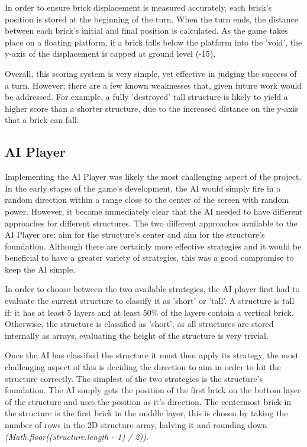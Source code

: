 \documentclass[runningheads]{llncs}
\begin{document}
	In order to ensure brick displacement is measured accurately, each brick's position is stored at the beginning of the turn. When the turn ends, the distance between each brick's initial and final position is calculated. As the game takes place on a floating platform, if a brick falls below the platform into the 'void', the y-axis of the displacement is capped at ground level (-15).
	
	Overall, this scoring system is very simple, yet effective in judging the success of a turn. However; there are a few known weaknesses that, given future work would be addressed. For example, a fully 'destroyed' tall structure is likely to yield a higher score than a shorter structure, due to the increased distance on the y-axis that a brick can fall.
	
	\subsection{AI Player}
	Implementing the AI Player was likely the most challenging aspect of the project. In the early stages of the game's development, the AI would simply fire in a random direction within a range close to the center of the screen with random power. However, it became immediately clear that the AI needed to have different approaches for different structures. The two different approaches available to the AI Player are: aim for the structure's center and aim for the structure's foundation. Although there are certainly more effective strategies and it would be beneficial to have a greater variety of strategies, this was a good compromise to keep the AI simple.
	
	In order to choose between the two available strategies, the AI player first had to evaluate the current structure to classify it as 'short' or 'tall'. A structure is tall if: it has at least 5 layers and at least 50\% of the layers contain a vertical brick. Otherwise, the structure is classified as 'short', as all structures are stored internally as arrays, evaluating the height of the structure is very trivial. 
	
	Once the AI has classified the structure it must then apply its strategy, the most challenging aspect of this is deciding the direction to aim in order to hit the structure correctly. The simplest of the two strategies is the structure's foundation. The AI simply gets the position of the first brick on the bottom layer of the structure and uses the position as it's direction. The centermost brick in the structure is the first brick in the middle layer, this is chosen by taking the number of rows in the 2D structure array, halving it and rounding down \textit{(Math.floor((structure.length - 1) / 2))}.
	
\end{document}
